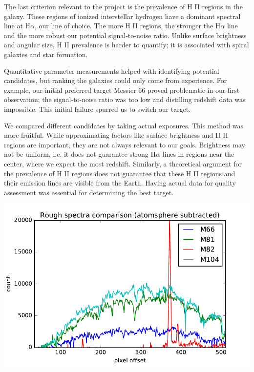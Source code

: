 \documentclass[useAMS,usenatbib]{mn2e}
\begin{document}
    	The last criterion relevant to the project is the prevalence of H II regions in the galaxy. These regions of ionized interstellar hydrogen have a dominant spectral line at H$\alpha$, our line of choice. The more H II regions, the stronger the H$\alpha$ line and the more robust our potential signal-to-noise ratio. Unlike surface brightness and angular size, H II prevalence is harder to quantify; it is associated with spiral galaxies and star formation.\par
    
  Quantitative parameter measurements helped with identifying potential candidates, but ranking the galaxies could only come from experience. For example, our initial preferred target Messier 66 proved problematic in our first observation; the signal-to-noise ratio was too low and distilling redshift data was impossible. This initial failure spurred us to switch our target. 

We compared different candidates by taking actual exposures. This method was more fruitful. While approximating factors like surface brightness and H II regions are important, they are not always relevant to our goals. Brightness may not be uniform, i.e. it does not guarantee strong H$\alpha$ lines in regions near the center, where we expect the most redshift. Similarly, a theoretical argument for the prevalence of H II regions does not guarantee that these H II regions and their emission lines are visible from the Earth. Having actual data for quality assessment was essential for determining the best target.

\vspace{15mm}

\includegraphics[width=\linewidth]{comparison-atmosphere-subtracted.pdf}
\end{document}
